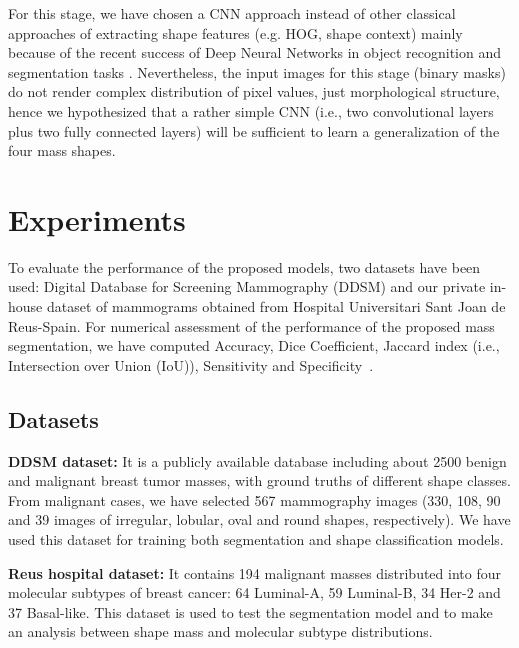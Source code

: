 \documentclass[runningheads,a4paper]{llncs}
\begin{document}
For this stage, we have chosen a CNN approach instead of other classical approaches of extracting shape features (e.g. HOG, shape context) mainly because of the recent success of Deep Neural Networks in object recognition and segmentation tasks \cite{litjens2017survey}. Nevertheless, the input images for this stage (binary masks) do not render complex distribution of pixel values, just morphological structure, hence we hypothesized that a rather simple CNN (i.e., two convolutional layers plus two fully connected layers) will be sufficient to learn a generalization of the four mass shapes. 


\section{Experiments}

To evaluate the performance of the proposed models, two datasets have been used: Digital Database for Screening Mammography (DDSM) \cite{heath2000digital} and our private in-house dataset of mammograms obtained from Hospital Universitari Sant Joan de Reus-Spain. For numerical assessment of the performance of the proposed mass segmentation, we have computed Accuracy, Dice Coefficient, Jaccard index (i.e., Intersection over Union (IoU)), Sensitivity and Specificity~\cite{vacavant2012benchmark}. 

\subsection{Datasets}
\textbf{DDSM dataset:} It is a publicly available database including about 2500 benign and malignant breast tumor masses, with ground truths of different shape classes. From malignant cases, we have selected 567 mammography images (330, 108, 90 and 39 images of irregular, lobular, oval and round shapes, respectively). We have used this dataset for training both segmentation and shape classification models.

\textbf{Reus hospital dataset:} It contains 194 malignant masses distributed into four molecular subtypes of breast cancer: 64 Luminal-A, 59 Luminal-B, 34 Her-2 and 37 Basal-like. This dataset is used to test the segmentation model and to make an analysis between shape mass and molecular subtype distributions.
\end{document}
